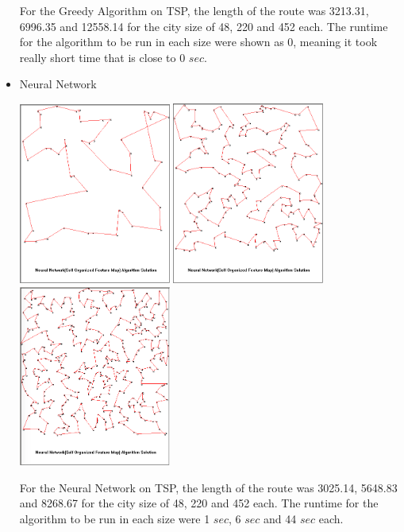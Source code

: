 \documentclass[12pt]{article}
\begin{document}
\begin{itemize}
For the Greedy Algorithm on TSP, the length of the route was 3213.31, 6996.35 and 12558.14 for the city size of 48, 220 and 452 each. The runtime for the algorithm to be run in each size were shown as $0$, meaning it took really short time that is close to $0$ $sec$.

\item Neural Network
		\begin{center}
			\includegraphics[width=5cm]{Neural48.PNG}
            \includegraphics[width=5cm]{Neural220.PNG}
            \includegraphics[width=5cm]{Neural452.png}
		\end{center}

For the Neural Network on TSP, the length of the route was 3025.14, 5648.83 and 8268.67 for the city size of 48, 220 and 452 each. The runtime for the algorithm to be run in each size were 1 $sec$, 6 $sec$ and 44 $sec$ each. 


\end{itemize}
\end{document}
